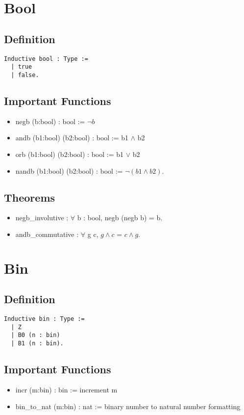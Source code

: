\documentclass[12pt,a4paper]{article}
\theoremstyle{case}
\begin{document}
\section{Bool}
\subsection{Definition}
\begin{verbatim}
Inductive bool : Type :=
  | true
  | false.
\end{verbatim}
\subsection{Important Functions}
\begin{itemize}
    \item negb (b:bool) : bool := $\neg b$  
    \item andb (b1:bool) (b2:bool) : bool := b1 $\land$ b2 
    \item orb (b1:bool) (b2:bool) : bool := b1 $\lor$ b2 
    \item nandb (b1:bool) (b2:bool) : bool := $\neg (b1 \land b2)$. 
\end{itemize}
\subsection{Theorems}
\begin{itemize}
    \item negb\_involutive : $\forall$ b : bool, negb (negb b) = b.
    \item andb\_commutative : $\forall$ g c, $g \land c$ = $c\land g$.
\end{itemize}


\section{Bin}
\subsection{Definition}
\begin{verbatim}
Inductive bin : Type :=
  | Z
  | B0 (n : bin)
  | B1 (n : bin).
\end{verbatim}
\subsection{Important Functions}
\begin{itemize}
    \item incr (m:bin) : bin := increment m
    \item bin\_to\_nat (m:bin) : nat := binary number to natural number formatting 
\end{itemize}
\end{document}
